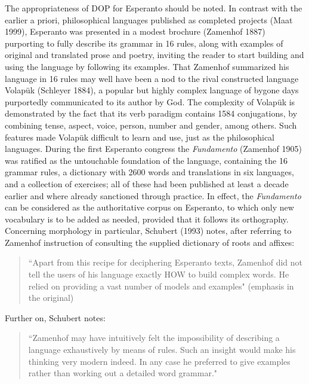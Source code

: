 \documentclass[10pt,a4paper]{article}
\begin{document}
The appropriateness of DOP for Esperanto should be noted. In contrast with the
earlier a priori, philosophical languages published as completed projects
(Maat 1999), Esperanto was presented in a modest brochure (Zamenhof 1887)
purporting to fully describe its grammar in 16 rules, along with examples of
original and translated prose and poetry, inviting the reader to start
building and using the language by following its examples. That Zamenhof
summarized his language in 16 rules may well have been a nod to the rival
constructed language Volap\"uk (Schleyer 1884), a popular but highly complex
language of bygone days purportedly communicated to its author by God.  The
complexity of Volap\"uk is demonstrated by the fact that its verb paradigm
contains 1584 conjugations, by combining tense, aspect, voice, person, number
and gender, among others. Such features made Volap\"uk difficult to learn and
use, just as the philosophical languages. During the first Esperanto congress
the {\em Fundamento} (Zamenhof 1905) was ratified as the untouchable foundation of
the language, containing the 16 grammar rules, a dictionary with 2600 words
and translations in six languages, and a collection of exercises; all of these
had been published at least a decade earlier and where already sanctioned
through practice. In effect, the {\em Fundamento} can be considered as the
authoritative corpus on Esperanto, to which only new vocabulary is to be added
as needed, provided that it follows its orthography. Concerning morphology in
particular, Schubert (1993) notes, after referring to Zamenhof instruction of
consulting the supplied dictionary of roots and affixes:

\begin{quote}
	``Apart from this recipe for deciphering Esperanto texts,
	Zamenhof did not tell the users of his language exactly HOW to
	build complex words. He relied on providing a vast number of models and
	examples" (emphasis in the original)
\end{quote}

Further on, Schubert notes:

\begin{quote}
	``Zamenhof may have intuitively felt the impossibility of describing a
	language exhaustively by means of rules. Such an insight would make his
	thinking very modern indeed. In any case he preferred to give examples
	rather than working out a detailed word grammar."
\end{quote}
\end{document}
